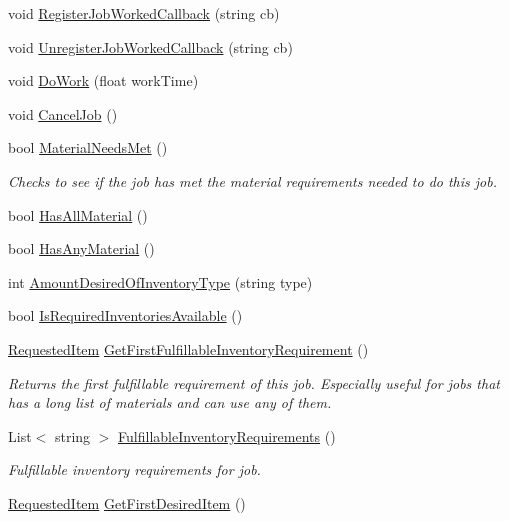 \begin{DoxyCompactItemize}
\item 
void \hyperlink{class_job_ae6991b1a825e7f8dc2fa111d1a04cb7b}{Register\+Job\+Worked\+Callback} (string cb)
\item 
void \hyperlink{class_job_a3abd52db21d9340c3055035c203a8577}{Unregister\+Job\+Worked\+Callback} (string cb)
\item 
void \hyperlink{class_job_a072183f0b0e76cb6dc9839435135b410}{Do\+Work} (float work\+Time)
\item 
void \hyperlink{class_job_af944847e4846c7e243787d0d4536e1b4}{Cancel\+Job} ()
\item 
bool \hyperlink{class_job_a31ad0e22267859ee2a2574cf5e49cac1}{Material\+Needs\+Met} ()
\begin{DoxyCompactList}\small\item\em Checks to see if the job has met the material requirements needed to do this job. \end{DoxyCompactList}\item 
bool \hyperlink{class_job_a1d272ad587bd70f2aeca6aba7ced837b}{Has\+All\+Material} ()
\item 
bool \hyperlink{class_job_a5225110615c06f8fca994f884073fe90}{Has\+Any\+Material} ()
\item 
int \hyperlink{class_job_a335532dd354ea5a99bbe5c49312689e8}{Amount\+Desired\+Of\+Inventory\+Type} (string type)
\item 
bool \hyperlink{class_job_a6f863c4a232bab7636ac7e075a2736d1}{Is\+Required\+Inventories\+Available} ()
\item 
\hyperlink{class_project_porcupine_1_1_jobs_1_1_requested_item}{Requested\+Item} \hyperlink{class_job_a0c3b5631b1791f188927ba33186d3446}{Get\+First\+Fulfillable\+Inventory\+Requirement} ()
\begin{DoxyCompactList}\small\item\em Returns the first fulfillable requirement of this job. Especially useful for jobs that has a long list of materials and can use any of them. \end{DoxyCompactList}\item 
List$<$ string $>$ \hyperlink{class_job_ad4e44203afda2abff6219ec02cc61a9b}{Fulfillable\+Inventory\+Requirements} ()
\begin{DoxyCompactList}\small\item\em Fulfillable inventory requirements for job. \end{DoxyCompactList}\item 
\hyperlink{class_project_porcupine_1_1_jobs_1_1_requested_item}{Requested\+Item} \hyperlink{class_job_a8dde17edcf1f5d45a8ead9c663d02ad2}{Get\+First\+Desired\+Item} ()

\end{DoxyCompactItemize}
